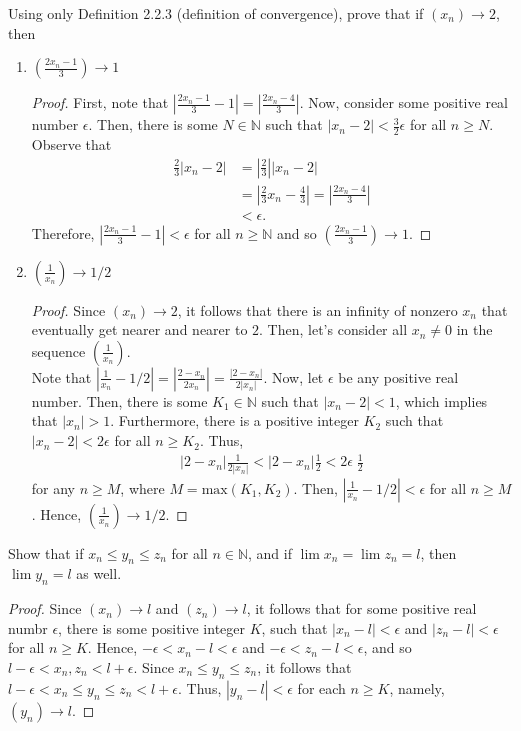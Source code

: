 \documentclass[12pt]{article}
\newcommand{\N}{\mathbb{N}}
\newcommand{\Abs}[1]{\left\vert #1 \right\vert}
\newenvironment{problem}[2][Problem]{\begin{trivlist} \item[\hskip \labelsep {\bfseries #1}\hskip \labelsep {\bfseries #2.}]}{\end{trivlist}}
\begin{document}
    \begin{problem}{2.3.2}
      Using only Definition 2.2.3 (definition of convergence), prove that if $(x_{n})\to 2$, then 
    \begin{enumerate}
      \item $\left( \frac{2x_{n}-1}{3} \right)\to 1$
    \begin{proof}
      First, note that $\Abs{\frac{2x_{n}-1}{3}-1} = \Abs{\frac{2x_{n}-4}{3}}$. Now, consider some positive real number $\epsilon$. Then, there is some $N\in \N$ such that $\Abs{x_{n}-2}<\frac{3}{2} \epsilon$ for all $n\geq N$. Observe that
    \begin{align*}
    \frac{2}{3}\Abs{x_{n}-2} &= \Abs{\frac{2}{3}}\Abs{x_{n}-2}\\
  &= \Abs{\frac{2}{3}x_{n}-\frac{4}{3}} = \Abs{\frac{2x_{n}-4}{3}}\\
  &< \epsilon.
    \end{align*}
    Therefore, $\Abs{\frac{2x_{n}-1}{3}-1}<\epsilon$ for all $n\geq \N$ and so $\left( \frac{2x_{n}-1}{3} \right)\to 1$. 
    \end{proof}
      \item $\left( \frac{1}{x_{n}} \right)\to 1/2$
    \begin{proof}
      Since $(x_{n})\to 2$, it follows that there is an infinity of nonzero $x_{n}$ that eventually get nearer and nearer to $2$. Then, let's consider all $x_{n} \neq 0$ in the sequence $\left( \frac{1}{x_{n}} \right)$. \\
      Note that $\Abs{\frac{1}{x_{n}}-1/2} = \Abs{\frac{2-x_{n}}{2x_{n}}} = \frac{\Abs{2-x_{n}}}{2\Abs{x_{n}}}$. Now, let $\epsilon$ be any positive real number. Then, there is some $K_{1}\in \N$ such that $|x_{n}-2| < 1$, which implies that $|x_{n}| > 1$. Furthermore, there is a positive integer $K_{2}$ such that $|x_{n}-2| < 2\epsilon$ for all $n\geq K_{2}$. Thus, 
    \begin{align*}
      \Abs{2-x_{n}}\frac{1}{2|x_{n}|} < \Abs{2-x_{n}}\frac{1}{2} < 2\epsilon\;\frac{1}{2} 
    \end{align*}
    for any $n\geq M$, where $M=\mathrm{max}(K_{1},K_{2})$. Then, $\Abs{\frac{1}{x_{n}}-1/2}<\epsilon$ for all $n\geq M$. Hence, $\left( \frac{1}{x_{n}} \right)\to 1/2$.
    \end{proof}
    \end{enumerate}
    \end{problem}
    \begin{problem}{2.3.3 (Squeeze Theorem)}
      Show that if $x_{n} \leq y_{n} \leq z_{n}$ for all $n\in \N$, and if $\lim x_{n} = \lim z_{n} = l$, then $\lim y_{n} = l$ as well.
    \begin{proof}
      Since $(x_{n})\to l$ and $(z_{n}) \to l$, it follows that for some positive real numbr $\epsilon$, there is some positive integer $K$, such that $|x_{n}-l|<\epsilon$ and $|z_{n}-l|<\epsilon$ for all $n\geq K$. Hence, $-\epsilon< x_{n}-l < \epsilon$  and $-\epsilon < z_{n} -l <\epsilon$, and so $l-\epsilon < x_{n},z_{n} < l+\epsilon$. Since $x_{n} \leq y_{n} \leq z_{n}$, it follows that $l-\epsilon < x_{n} \leq y_{n} \leq z_{n} < l+\epsilon$. Thus, $|y_{n}-l| < \epsilon$ for each $n\geq K$, namely, $(y_{n}) \to l$.  
    \end{proof}
    \end{problem}
\end{document}
